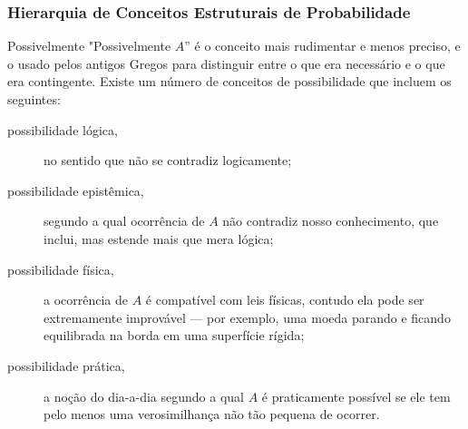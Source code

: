 %
\begin{frame}
\frametitle{\textbf{Hierarquia de Conceitos Estruturais de Probabilidade}}
\baselineskip=13pt
\begin{block}{Possivelmente}
"Possivelmente $A$'' é o conceito mais
rudimentar e menos preciso, e o usado pelos antigos Gregos para
distinguir entre o que era necessário e o que era contingente.
Existe um número de conceitos de possibilidade que incluem os
seguintes:

\begin{description}
\item[possibilidade lógica,] no sentido que não se contradiz
logicamente;
\item[possibilidade epistêmica,] segundo a qual ocorrência de $A$
não contradiz nosso conhecimento, que inclui, mas estende mais que
mera lógica;
\item[possibilidade física,] a ocorrência de $A$ é compatível com
leis físicas, contudo ela pode ser extremamente improvável --- por
exemplo, uma moeda parando e ficando equilibrada na borda em uma
superfície rígida;
\item[possibilidade prática,] a noção do dia-a-dia segundo a qual
$A$ é praticamente possível se ele tem pelo menos uma
verosimilhança não tão pequena de ocorrer.
\end{description}
\end{block}
\end{frame}
%
